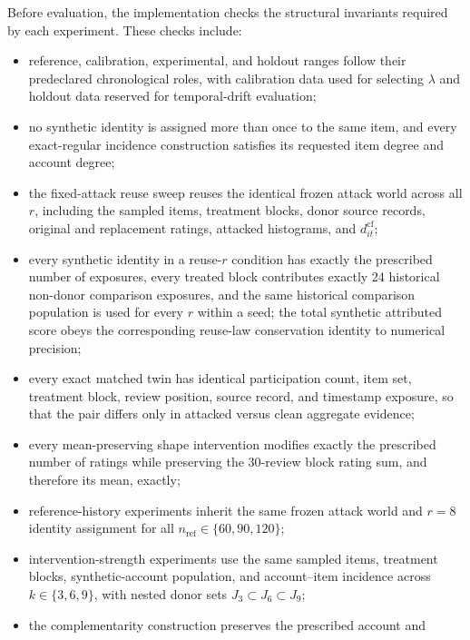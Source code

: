 Before evaluation, the implementation checks the structural invariants required
by each experiment. These checks include:
\begin{itemize}
    \item reference, calibration, experimental, and holdout ranges follow their
          predeclared chronological roles, with calibration data used for
          selecting $\lambda$ and holdout data reserved for temporal-drift
          evaluation;
    \item no synthetic identity is assigned more than once to the same item,
          and every exact-regular incidence construction satisfies its requested
          item degree and account degree;
    \item the fixed-attack reuse sweep reuses the identical frozen attack world
          across all $r$, including the sampled items, treatment blocks, donor
          source records, original and replacement ratings, attacked
          histograms, and $d_{it}^{\mathrm{cf}}$;
    \item every synthetic identity in a reuse-$r$ condition has exactly the
prescribed number of exposures, every treated block contributes exactly
24 historical non-donor comparison exposures, and the same historical
comparison population is used for every $r$ within a seed; the total
synthetic attributed score obeys the corresponding reuse-law conservation
identity to numerical precision;
    \item every exact matched twin has identical participation count, item set,
          treatment block, review position, source record, and timestamp
          exposure, so that the pair differs only in attacked versus clean
          aggregate evidence;
    \item every mean-preserving shape intervention modifies exactly the
          prescribed number of ratings while preserving the 30-review block
          rating sum, and therefore its mean, exactly;
    \item reference-history experiments inherit the same frozen attack world
          and $r=8$ identity assignment for all
          $n_{\mathrm{ref}}\in\{60,90,120\}$;
    \item intervention-strength experiments use the same sampled items,
          treatment blocks, synthetic-account population, and account--item
          incidence across $k\in\{3,6,9\}$, with nested donor sets
          $J_3\subset J_6\subset J_9$;
    \item the complementarity construction preserves the prescribed account and

\end{itemize}

